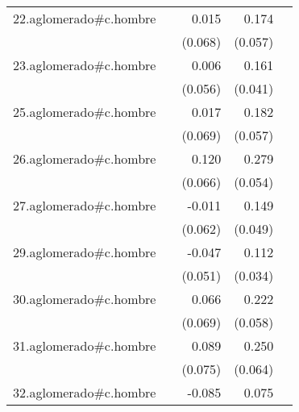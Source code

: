 {\begin{longtable}{l*{4}{D{.}{.}{-1}}}
\addlinespace
22.aglomerado#c.hombre&                     &       0.015         &       0.174\sym{**} &                     \\
            &                     &     (0.068)         &     (0.057)         &                     \\
\addlinespace
23.aglomerado#c.hombre&                     &       0.006         &       0.161\sym{***}&                     \\
            &                     &     (0.056)         &     (0.041)         &                     \\
\addlinespace
25.aglomerado#c.hombre&                     &       0.017         &       0.182\sym{**} &                     \\
            &                     &     (0.069)         &     (0.057)         &                     \\
\addlinespace
26.aglomerado#c.hombre&                     &       0.120         &       0.279\sym{***}&                     \\
            &                     &     (0.066)         &     (0.054)         &                     \\
\addlinespace
27.aglomerado#c.hombre&                     &      -0.011         &       0.149\sym{**} &                     \\
            &                     &     (0.062)         &     (0.049)         &                     \\
\addlinespace
29.aglomerado#c.hombre&                     &      -0.047         &       0.112\sym{**} &                     \\
            &                     &     (0.051)         &     (0.034)         &                     \\
\addlinespace
30.aglomerado#c.hombre&                     &       0.066         &       0.222\sym{***}&                     \\
            &                     &     (0.069)         &     (0.058)         &                     \\
\addlinespace
31.aglomerado#c.hombre&                     &       0.089         &       0.250\sym{***}&                     \\
            &                     &     (0.075)         &     (0.064)         &                     \\
\addlinespace
32.aglomerado#c.hombre&                     &      -0.085         &       0.075\sym{*}  &                     \\

\end{longtable}}
